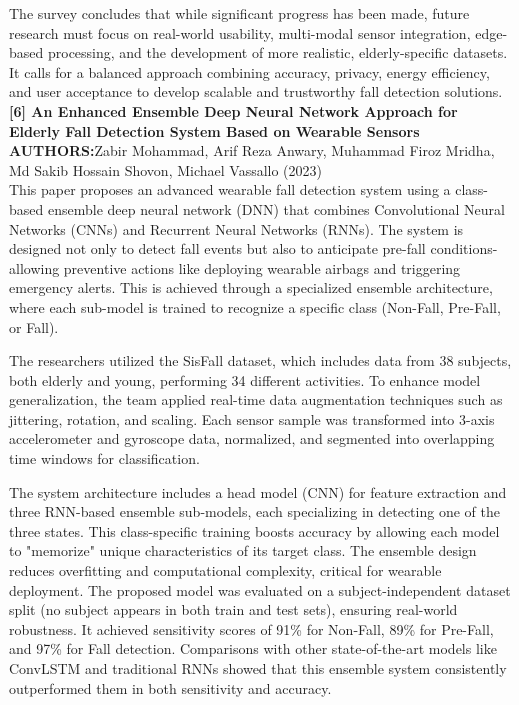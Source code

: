 \documentclass[a4paper, 12pt]{report}
\begin{document}
The survey concludes that while significant progress has been made, future research must focus on real-world usability, multi-modal sensor integration, edge-based processing, and the development of more realistic, elderly-specific datasets. It calls for a balanced approach combining accuracy, privacy, energy efficiency, and user acceptance to develop scalable and trustworthy fall detection solutions.\\
\noindent\textbf{[6] An Enhanced Ensemble Deep Neural Network Approach for Elderly Fall Detection System Based on Wearable Sensors}\\
\textbf{AUTHORS:}Zabir Mohammad, Arif Reza Anwary, Muhammad Firoz Mridha, Md Sakib Hossain Shovon, Michael Vassallo (2023)\\
This paper proposes an advanced wearable fall detection system using a class-based ensemble deep neural network (DNN) that combines Convolutional Neural Networks (CNNs) and Recurrent Neural Networks (RNNs). The system is designed not only to detect fall events but also to anticipate pre-fall conditions-allowing preventive actions like deploying wearable airbags and triggering emergency alerts. This is achieved through a specialized ensemble architecture, where each sub-model is trained to recognize a specific class (Non-Fall, Pre-Fall, or Fall).

The researchers utilized the SisFall dataset, which includes data from 38 subjects, both elderly and young, performing 34 different activities. To enhance model generalization, the team applied real-time data augmentation techniques such as jittering, rotation, and scaling. Each sensor sample was transformed into 3-axis accelerometer and gyroscope data, normalized, and segmented into overlapping time windows for classification.

The system architecture includes a head model (CNN) for feature extraction and three RNN-based ensemble sub-models, each specializing in detecting one of the three states. This class-specific training boosts accuracy by allowing each model to "memorize" unique characteristics of its target class. The ensemble design reduces overfitting and computational complexity, critical for wearable deployment.
The proposed model was evaluated on a subject-independent dataset split (no subject appears in both train and test sets), ensuring real-world robustness. It achieved sensitivity scores of 91\% for Non-Fall, 89\% for Pre-Fall, and 97\% for Fall detection. Comparisons with other state-of-the-art models like ConvLSTM and traditional RNNs showed that this ensemble system consistently outperformed them in both sensitivity and accuracy.
\end{document}
